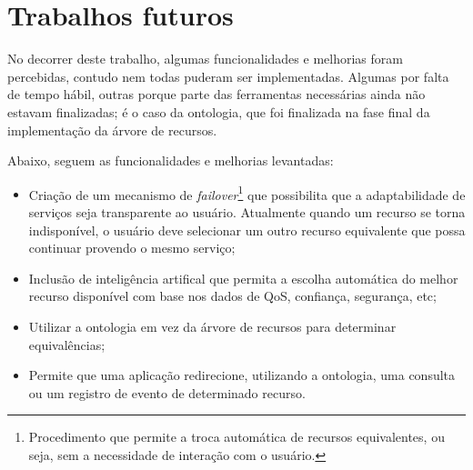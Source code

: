 \section{Trabalhos futuros}
\label{sec:trabalhosFuturos}

No decorrer deste trabalho, algumas funcionalidades e melhorias foram percebidas, contudo nem todas puderam ser implementadas. Algumas por falta de tempo hábil, outras porque parte das ferramentas necessárias ainda não estavam finalizadas; é o caso da ontologia, que foi finalizada na fase final da implementação da árvore de recursos.

Abaixo, seguem as funcionalidades e melhorias levantadas:

\begin{itemize}
	\item Criação de um mecanismo de \emph{failover}\footnote{Procedimento que permite a troca automática de recursos equivalentes, ou seja, sem a necessidade de interação com o usuário.} que possibilita que a adaptabilidade de serviços seja transparente ao usuário. Atualmente quando um recurso se torna indisponível, o usuário deve selecionar um outro recurso equivalente que possa continuar provendo o mesmo serviço;
	\item Inclusão de inteligência artifical que permita a escolha automática do melhor recurso disponível com base nos dados de QoS, confiança, segurança, etc;
	\item Utilizar a ontologia em vez da árvore de recursos para determinar equivalências;
	\item Permite que uma aplicação redirecione, utilizando a ontologia, uma consulta ou um registro de evento de determinado recurso.
\end{itemize}